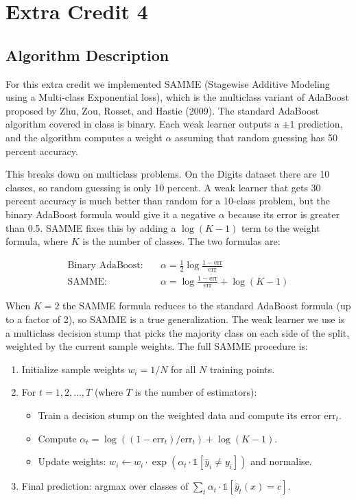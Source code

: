 \documentclass[11pt,letterpaper]{article}
\begin{document}
\section{Extra Credit 4}

\subsection{Algorithm Description}

For this extra credit we implemented SAMME (Stagewise Additive Modeling
using a Multi-class Exponential loss), which is the multiclass variant of
AdaBoost proposed by Zhu, Zou, Rosset, and Hastie (2009). The standard
AdaBoost algorithm covered in class is binary. Each weak learner outputs a
$\pm 1$ prediction, and the algorithm computes a weight $\alpha$ assuming
that random guessing has 50 percent accuracy.

This breaks down on multiclass problems. On the Digits dataset there are 10
classes, so random guessing is only 10 percent. A weak learner that gets
30 percent accuracy is much better than random for a 10-class problem, but
the binary AdaBoost formula would give it a negative $\alpha$ because its
error is greater than 0.5. SAMME fixes this by adding a $\log(K-1)$ term to
the weight formula, where $K$ is the number of classes. The two formulas are:

\begin{align}
\text{Binary AdaBoost:} \quad & \alpha = \frac{1}{2}\log\frac{1-\text{err}}{\text{err}} \\
\text{SAMME:} \quad & \alpha = \log\frac{1-\text{err}}{\text{err}} + \log(K-1)
\end{align}

When $K=2$ the SAMME formula reduces to the standard AdaBoost formula (up to
a factor of 2), so SAMME is a true generalization. The weak learner we use
is a multiclass decision stump that picks the majority class on each side of
the split, weighted by the current sample weights. The full SAMME procedure
is:

\begin{enumerate}
\item Initialize sample weights $w_i = 1/N$ for all $N$ training points.
\item For $t = 1, 2, \dots, T$ (where $T$ is the number of estimators):
  \begin{itemize}
  \item Train a decision stump on the weighted data and compute its error
        $\text{err}_t$.
  \item Compute $\alpha_t = \log((1-\text{err}_t)/\text{err}_t) + \log(K-1)$.
  \item Update weights: $w_i \leftarrow w_i \cdot \exp(\alpha_t \cdot \mathbb{1}[\hat{y}_i \neq y_i])$
        and normalise.
  \end{itemize}
\item Final prediction: argmax over classes of $\sum_t \alpha_t \cdot \mathbb{1}[\hat{y}_t(x) = c]$.
\end{enumerate}
\end{document}
